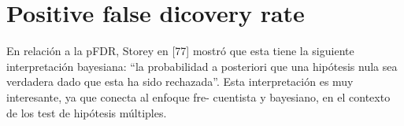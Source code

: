 \documentclass[11pt,letterpaper]{article}
\begin{document}
\section{Positive false dicovery rate}
En relación a la pFDR, Storey en [77] mostró que esta tiene la siguiente interpretación
bayesiana: “la probabilidad a posteriori que una hipótesis nula sea verdadera dado que esta
ha sido rechazada”. Esta interpretación es muy interesante, ya que conecta al enfoque fre-
cuentista y bayesiano, en el contexto de los test de hipótesis múltiples.
\end{document}
